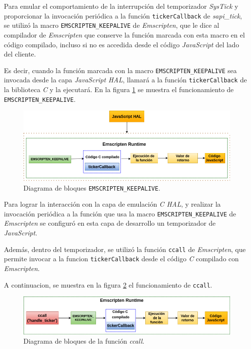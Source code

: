 Para emular el comportamiento de la interrupción del temporizador \textit{SysTick} y proporcionar la invocación periódica a la función \texttt{tickerCallback} de \textit{sapi\_tick}, se utilizó la macro \texttt{EMSCRIPTEN\_KEEPALIVE} de \textit{Emscripten}, que le dice al compilador de \textit{Emscripten} que conserve la función marcada con esta macro en el código compilado, incluso si no es accedida desde el código \textit{JavaScript} del lado del cliente.

Es decir, cuando la función marcada con la macro \texttt{EMSCRIPTEN\_KEEPALIVE} sea invocada desde la capa \textit{JavaScript HAL}, llamará a la función \texttt{tickerCallback} de la biblioteca \textit{C} y la ejecutará. En la figura \ref{fig:tickerCallback} se muestra el funcionamiento de \texttt{EMSCRIPTEN\_KEEPALIVE}. 

\begin{figure}[ht]
	\centering
	\includegraphics[scale=.46]{./Figures/tickerCallback.png}
	\caption{Diagrama de bloques \texttt{EMSCRIPTEN\_KEEPALIVE}.}
	\label{fig:tickerCallback}
\end{figure}

Para lograr la interacción con la capa de emulación \textit{C HAL}, y realizar la invocación periódica a la función que usa la macro \texttt{EMSCRIPTEN\_KEEPALIVE} de \textit{Emscripten} se configuró en esta capa de desarrollo un temporizador de \textit{JavaScript}.

Además, dentro del temporizador, se utilizó la función \texttt{ccall} de \textit{Emscripten}, que permite invocar a la funcion \texttt{tickerCallback} desde el código \textit{C} compilado con \textit{Emscripten}. 

A continuacion, se muestra en la figura  \ref{fig:ccall} el funcionamiento de \texttt{ccall}. 

\begin{figure}[ht]
	\centering
	\includegraphics[scale=.46]{./Figures/ccall.png}
	\caption{Diagrama de bloques de la función \textit{ccall}.}
	\label{fig:ccall}
\end{figure}

